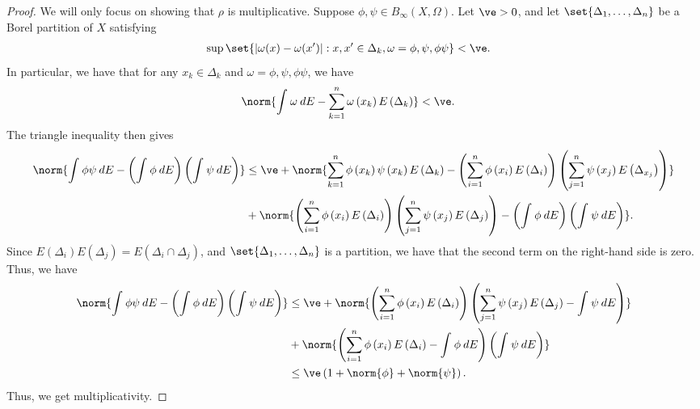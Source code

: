 \documentclass[10pt]{mypackage}
\begin{document}
\begin{proof}
  We will only focus on showing that $\rho$ is multiplicative. Suppose $\phi,\psi\in B_{\infty}\left( X,\Omega \right)$. Let $\ve > 0$, and let $\set{\Delta_1,\dots,\Delta_n}$ be a Borel partition of $X$ satisfying
  \begin{align*}
    \sup\set{\left\vert \omega(x)-\omega(x') \right\vert : x,x'\in\Delta_k,\omega=\phi,\psi,\phi\psi} &< \ve.
  \end{align*}
  In particular, we have that for any $x_k\in \Delta_k$ and $\omega = \phi,\psi,\phi\psi$, we have
  \begin{align*}
    \norm{ \int_{}^{} \omega\:dE - \sum_{k=1}^{n} \omega\left( x_k \right)E\left( \Delta_k \right) } &< \ve.
  \end{align*}
  The triangle inequality then gives
  \begin{align*}
    \norm{ \int_{}^{} \phi\psi\:dE - \left( \int_{}^{} \phi\:dE \right) \left( \int_{}^{} \psi\:dE \right) } &\leq \ve + \norm{\sum_{k=1}^{n}\phi\left( x_k \right)\psi\left( x_k \right)E\left( \Delta_k \right) - \left( \sum_{i=1}^{n}\phi\left( x_i \right)E\left( \Delta_i \right) \right)\left( \sum_{j=1}^{n}\psi\left( x_j \right)E\left( \Delta_{x_j} \right) \right)}\\
                & + \norm{ \left( \sum_{i=1}^{n}\phi\left( x_i \right)E\left( \Delta_i \right) \right)\left( \sum_{j=1}^{n} \psi\left( x_j \right)E\left( \Delta_j \right) \right) - \left( \int_{}^{} \phi\:dE \right)\left( \int_{}^{} \psi\:dE \right) }.
  \end{align*}
  Since $E\left( \Delta_i \right)E\left( \Delta_j \right) = E\left( \Delta_i\cap \Delta_j \right)$, and $\set{\Delta_1,\dots,\Delta_n}$ is a partition, we have that the second term on the right-hand side is zero. Thus, we have
  \begin{align*}
    \norm{ \int_{}^{} \phi\psi\:dE - \left( \int_{}^{} \phi\:dE \right) \left( \int_{}^{} \psi\:dE \right) } &\leq \ve + \norm{ \left( \sum_{i=1}^{n}\phi\left( x_i \right)E\left( \Delta_i \right) \right) \left( \sum_{j=1}^{n} \psi\left( x_j \right)E\left( \Delta_j \right) - \int_{}^{} \psi\:dE \right) }\\
                &+ \norm{ \left( \sum_{i=1}^{n}\phi\left( x_i \right)E\left( \Delta_i \right) - \int_{}^{} \phi\:dE\right) \left( \int_{}^{} \psi\:dE \right) }\\
                &\leq \ve\left( 1 + \norm{\phi} + \norm{\psi} \right).
  \end{align*}
  Thus, we get multiplicativity.
\end{proof}
\end{document}
